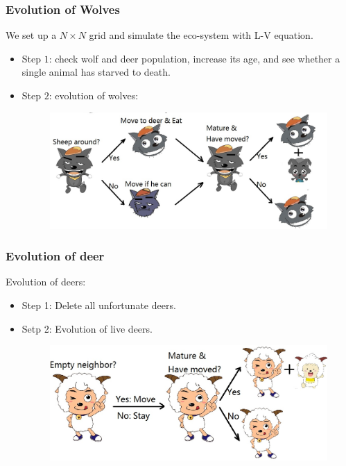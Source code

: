 \documentclass{beamer}
\begin{document}
\frame
{
  	\frametitle{Evolution of Wolves}
 	 We set up a $N \times N$ grid and simulate the eco-system with L-V equation. \\
  	 \begin{itemize}
  	\item<1->{Step $1$: check wolf and deer population, increase its age, and see whether a single animal has starved to death.}
  	\item<2->{Step $2$: evolution of wolves:
  
 	 \begin{figure}[htb]
  	\begin{center}
 	 \includegraphics[width=\textwidth]{./pics/wolf.jpeg}
 	 \label{default}
  	\end{center}
  	\end{figure}
 	 }
 	 \end{itemize}
}

\frame
{
  	\frametitle{Evolution of deer}
  	Evolution of deers: \\
 	\begin{itemize}
  	\item<1->{Step 1: Delete all unfortunate deers.}
  	\item<2->{Setp 2: Evolution of live deers.
 
  	\begin{figure}[htbp]
 	 \begin{center}
  	\includegraphics[width=\textwidth]{./pics/goat.jpeg}
  	\label{default}
 	 \end{center}
  	\end{figure}
  	}
   	\end{itemize}
}
\end{document}
